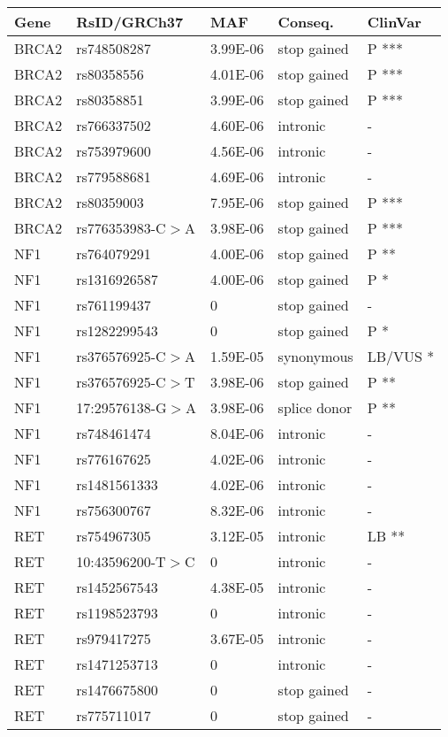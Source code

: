 \documentclass{book}
\begin{document}
\begin{refsection}
\begin{table}[!htb]
  \centering
  \begin{tabular}{lllll}
    \hline
    Gene  & RsID/GRCh37       & MAF      & Conseq.      & ClinVar \\
    \hline
    BRCA2 & rs748508287       & 3.99E-06 & stop gained  & P *** \\
    BRCA2 & rs80358556        & 4.01E-06 & stop gained  & P *** \\
    BRCA2 & rs80358851        & 3.99E-06 & stop gained  & P *** \\
    BRCA2 & rs766337502       & 4.60E-06 & intronic     & - \\
    BRCA2 & rs753979600       & 4.56E-06 & intronic     & - \\
    BRCA2 & rs779588681       & 4.69E-06 & intronic     & - \\
    BRCA2 & rs80359003        & 7.95E-06 & stop gained  & P *** \\
    BRCA2 & rs776353983-C$>$A & 3.98E-06 & stop gained  & P *** \\
    NF1   & rs764079291       & 4.00E-06 & stop gained  & P ** \\
    NF1   & rs1316926587      & 4.00E-06 & stop gained  & P * \\
    NF1   & rs761199437       & 0        & stop gained  & - \\
    NF1   & rs1282299543      & 0        & stop gained  & P * \\
    NF1   & rs376576925-C$>$A & 1.59E-05 & synonymous   & LB/VUS * \\
    NF1   & rs376576925-C$>$T & 3.98E-06 & stop gained  & P ** \\
    NF1   & 17:29576138-G$>$A & 3.98E-06 & splice donor & P ** \\
    NF1   & rs748461474       & 8.04E-06 & intronic     & - \\
    NF1   & rs776167625       & 4.02E-06 & intronic     & - \\
    NF1   & rs1481561333      & 4.02E-06 & intronic     & - \\
    NF1   & rs756300767       & 8.32E-06 & intronic     & - \\
    RET   & rs754967305       & 3.12E-05 & intronic     & LB ** \\
    RET   & 10:43596200-T$>$C & 0        & intronic     & - \\
    RET   & rs1452567543      & 4.38E-05 & intronic     & - \\
    RET   & rs1198523793      & 0        & intronic     & - \\
    RET   & rs979417275       & 3.67E-05 & intronic     & - \\
    RET   & rs1471253713      & 0        & intronic     & - \\
    RET   & rs1476675800      & 0        & stop gained  & - \\
    RET   & rs775711017       & 0        & stop gained  & - \\
    \hline
  \end{tabular}


\end{table}
\end{refsection}
\end{document}
